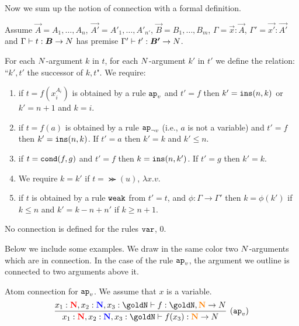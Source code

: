 Now we sum up the notion of connection with a formal definition.



\begin{definition}
Assume $\vec{A} = A_1, \ldots, A_n$, $\vec{A'} = A'_1, \ldots, A'_{n'}$,
$\vec{B}=B_1, \ldots, B_m$, $\Gamma = \vec{x}:\vec{A}$,
$\Gamma' = \vec{x'}:\vec{A'}$
and $\Gamma \vdash t:\vec{B} \rightarrow \N$
has premise $\Gamma' \vdash t':\vec{B'} \rightarrow \N$.


For each ${N}$-argument $k$ in $t$, for each ${N}$-argument $k'$ in $t'$ we define 
the relation: ``$k',t'$ the successor of $k,t$". We require:
\begin{enumerate}

\item
if $t=f(x_i^{A_i})$ is obtained by a rule $\apvar$ and $t'=f$ 
then $k' = {\tt ins}(n,k)$ or $k'=n+1$ and $k=i$.

\item
if $t=f(a)$ is obtained by a rule $\apnotvar$ (i.e., $a$ is not a variable) and $t'=f$ 
then $k' = {\tt ins}(n,k)$. If $t'=a$ then $k'=k$ and $k' \le n$.

\item
if $t={\tt cond}(f,g)$ and $t'=f$ 
then %
$k = {\tt ins}(n,k')$. 
If $t'=g$ then $k'=k$.

\item
We require $k = k'$ if $t = \Succ(u)$, $\lambda x.v$. 

\item
if $t$ is obtained by a rule ${\tt weak}$ from $t'=t$, and 
$\phi:\Gamma \rightarrow \Gamma'$ then $k = \phi(k')$ if $k \le n$
and $k' = k - n + n'$ if $k \ge n+1$.

\end{enumerate}
No connection is defined for the rules ${\tt var}$, $0$.
\end{definition}



Below we include some examples. 
We draw in the same color two ${N}$-arguments which are in connection. 
In the case of the rule $\apvar$, the argument we outline is 
connected to two arguments above it.


\begin{Eg}\label{eg:3}%
Atom connection for $\apvar$.
We assume that $x$ is a variable.
\[
\infer[(\apvar)]{
  x_1 : \bfColor{red}{\N},{x_2} : \bfColor{blue}{\N}, x_3  : \goldN
  \prove f(x_3) : \bfColor{orange}{\N} \rightarrow \N
}{
  x_1 : \bfColor{red}{\N},{x_2} : \bfColor{blue}{\N}, x_3  : \goldN
  \prove f : \goldN, \bfColor{orange}{\N} \rightarrow \N
}
\]
\end{Eg}

